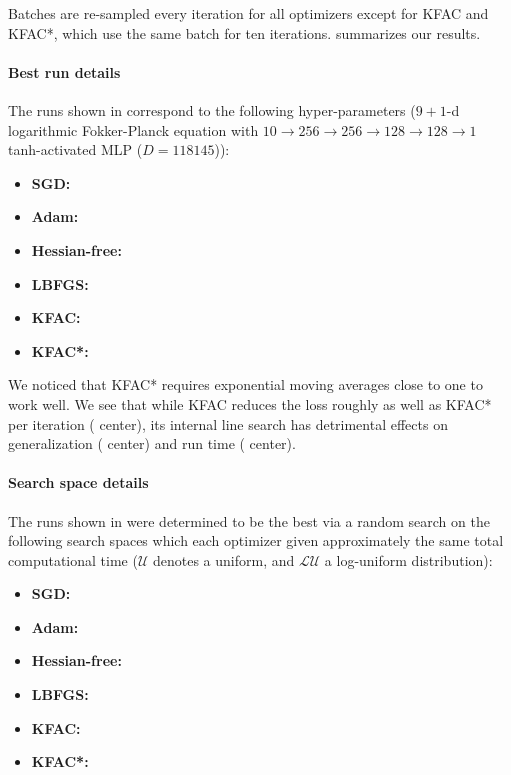 Batches are re-sampled every iteration for all optimizers except for KFAC and KFAC*, which use the same batch for ten iterations.
 summarizes our results.

\paragraph{Best run details} The runs shown in  correspond to the following hyper-parameters ($9+1$-d logarithmic Fokker-Planck equation with $10 \to 256 \to 256 \to 128 \to 128 \to 1$ tanh-activated MLP ($D=\num{118145}$)):
\begin{itemize}
  \def\pathToRuns{kfac_pinns_exp/exp43_log_fokker_planck9d_isotropic_gaussian_random/tex}
\item \textbf{SGD:} 
\item \textbf{Adam:} 
\item \textbf{Hessian-free:} 
\item \textbf{LBFGS:} 
\item \textbf{KFAC:} 
\item \textbf{KFAC*:} 
\end{itemize}
We noticed that KFAC* requires exponential moving averages close to one to work well.
We see that while KFAC reduces the loss roughly as well as KFAC* per iteration ( center), its internal line search has detrimental effects on generalization ( center) and run time ( center).

\paragraph{Search space details} The runs shown in  were determined to be the best via a random search on the following search spaces which each optimizer given approximately the same total computational time ($\mathcal{U}$ denotes a uniform, and $\mathcal{LU}$ a log-uniform distribution):
\begin{itemize}
  \def\pathToRuns{kfac_pinns_exp/exp43_log_fokker_planck9d_isotropic_gaussian_random/tex}
\item \textbf{SGD:} 
\item \textbf{Adam:} 
\item \textbf{Hessian-free:} 
\item \textbf{LBFGS:} 
\item \textbf{KFAC:} 
\item \textbf{KFAC*:} 
\end{itemize}

